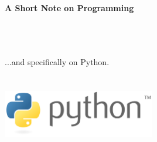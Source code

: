 %
%

\begin{frame}[c]
\textbf{\large A Short Note on Programming} ~\\~\\%
\begin{center}
	~\\~\\
	...and specifically on Python.~\\~\\~\\
	\colorbox{white}{\includegraphics[width=0.5\textwidth]{media/Python_logo.png}}
\end{center}
\end{frame}


